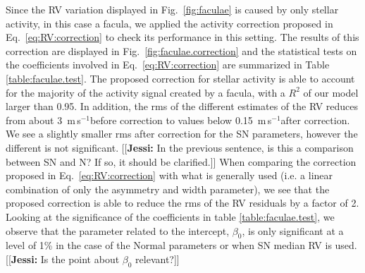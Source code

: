 \documentclass{aa}
\def\ms{\hbox{\,m\,s$^{-1}$}}         %
\newcommand{\jessi}[1]{{\color{Purple}[[\textbf{Jessi: }#1]]}}
\begin{document}
Since the RV variation displayed in Fig.~\ref{fig:faculae} is caused by only stellar activity, in this case a facula, we applied the activity correction proposed in Eq.~\ref{eq:RV:correction} to check its performance in this setting. 
The results of this correction are displayed in Fig.~\ref{fig:faculae.correction} and the statistical tests on the coefficients involved in Eq.~\ref{eq:RV:correction} are summarized in Table \ref{table:faculae.test}. 
The proposed correction for stellar activity is able to account for the majority of the activity signal created by a facula, with a $R^2$ of our model larger than 0.95. In addition, the rms of the different estimates of the RV reduces from about 3 \ms before correction to values below 0.15 \ms after correction.
We see a slightly smaller rms after correction for the SN parameters, however the different is not significant. \jessi{In the previous sentence, is this a comparison between SN and N?  If so, it should be clarified.}
When comparing the correction proposed in Eq.~\ref{eq:RV:correction} with what is generally used (i.e. a linear combination of only the asymmetry and width parameter), we see that the proposed correction is able to reduce the rms of the RV residuals by a factor of 2. Looking at the significance of the coefficients in table \ref{table:faculae.test}, we observe that the parameter related to the intercept, $\beta_0$, is only significant at a level of 1\% in the case of the Normal parameters or when SN median RV is used. \jessi{Is the point about $\beta_0$ relevant?}
\end{document}
